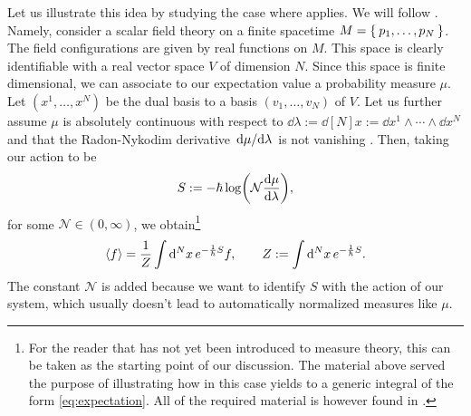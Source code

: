 Let us illustrate this idea by studying the case where  applies. We will follow \cite{Costello2016, Gwilliam2018}. Namely, consider a scalar field theory on a finite spacetime $M=\Set{p_1,\dots,p_{N}}$. The field configurations are given by real functions on $M$. This space is clearly identifiable with a real vector space $V$ of dimension $N$. Since this space is finite dimensional, we can associate to our expectation value a probability measure $\mu$. Let $(x^1,\dots,x^N)$ be the dual basis to a basis $(v_1,\dots,v_N)$ of $V$. Let us further assume $\mu$ is absolutely continuous with respect to $\dd\lambda:=\dd[N]x:=\dd x^1\wedge\cdots\wedge \dd x^N$ and that the Radon-Nykodim derivative $\dv*{\mu}{\lambda}$ is not vanishing . Then, taking our action to be
\begin{equation}
S:=-\hbar\log(\mathcal{N}\dv{\mu}{\lambda}),
\end{equation}
for some $\mathcal{N}\in(0,\infty)$, we obtain\footnote{For the reader that has not yet been introduced to measure theory, this can be taken as the starting point of our discussion. The material above served the purpose of illustrating how in this case  yields to a generic integral of the form \eqref{eq:expectation}. All of the required material is however found in \cite{Hewitt1975}.}
\begin{equation}
\ev{f}=\frac{1}{Z}\int\dd[N]{x} e^{-\frac{1}{\hbar}S}f, \qquad Z:=\int\dd[N]{x} e^{-\frac{1}{\hbar}S}.
\end{equation}
The constant $\mathcal{N}$ is added because we want to identify $S$ with the action of our system, which usually doesn't lead to automatically normalized measures like $\mu$.


